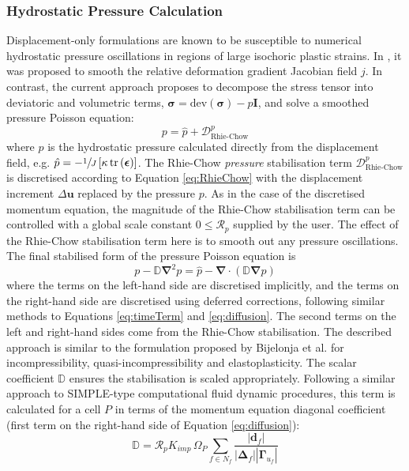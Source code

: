 \documentclass[sn-mathphys,Numbered]{sn-jnl}%
\newcommand{\bb}{\boldsymbol}
\begin{document}
\subsubsection{Hydrostatic Pressure Calculation} \label{sec:pressureApproach}
Displacement-only formulations are known to be susceptible to numerical hydrostatic pressure oscillations in regions of large isochoric plastic strains.
In \citet{cardiff_lagrangian_2017}, it was proposed to smooth the relative deformation gradient Jacobian field $j$.
In contrast, the current approach proposes to decompose the stress tensor into deviatoric and volumetric terms, $\bb{\sigma} = \text{dev}(\bb{\sigma}) - p \textbf{I}$, and solve a smoothed pressure Poisson equation:
\begin{equation}
	p = \hat{p} + \mathcal{D}_{\text{Rhie-Chow}}^p
\end{equation}
where $\hat{p}$ is the hydrostatic pressure calculated directly from the displacement field, e.g. $\hat{p} = -\sfrac{1}{J} \left[\kappa \, \text{tr}\left( \bb{\epsilon} \right)\right]$.
The Rhie-Chow \emph{pressure} stabilisation term $\mathcal{D}_{\text{Rhie-Chow}}^p$ is discretised according to Equation \ref{eq:RhieChow} with the displacement increment $\Delta \bb{u}$ replaced by the pressure $p$.
As in the case of the discretised momentum equation, the magnitude of the Rhie-Chow stabilisation term can be controlled with a global scale constant $0 \leq \mathcal{R}_p$ supplied by the user.
The effect of the Rhie-Chow stabilisation term here is to smooth out any pressure oscillations.
The final stabilised form of the pressure Poisson equation is 
\begin{equation} \label{eq:pressureEqn}
	p - \mathbb{D} \bb{\nabla}^2 p = \hat{p} - \bb{\nabla} \cdot \left( \mathbb{D} \bb{\nabla} p \right)
\end{equation}
where the terms on the left-hand side are discretised implicitly, and the terms on the right-hand side are discretised using deferred corrections, following similar methods to Equations \ref{eq:timeTerm} and \ref{eq:diffusion}.
The second terms on the left and right-hand sides come from the Rhie-Chow stabilisation.
The described approach is similar to the formulation proposed by Bijelonja et al. \cite{Bijelonja2002, Bijelonja2005a, Bijelonja2005b, Bijelonja2006} for incompressibility, quasi-incompressibility and elastoplasticity.
The scalar coefficient $\mathbb{D}$ ensures the stabilisation is scaled appropriately. Following a similar approach to SIMPLE-type computational fluid dynamic procedures, this term is calculated for a cell $P$ in terms of the momentum equation diagonal coefficient (first term on the right-hand side of Equation \ref{eq:diffusion}):
\begin{equation}
	\mathbb{D} = \mathcal{R}_p K_{imp} \, \Omega_P \sum_{f \in N_f} 
	 \frac{\left|\boldsymbol{d}_f\right|}{\left|\boldsymbol{\Delta}_f\right| \left|\bb{\Gamma}_{u_f}\right| }
\end{equation}
\end{document}
